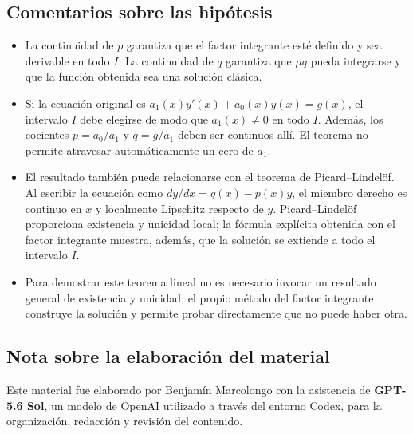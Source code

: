 \documentclass[12pt,a4paper]{article}
\begin{document}
	\subsection{Comentarios sobre las hipótesis}

	\begin{itemize}[leftmargin=*]
		\item La continuidad de \(p\) garantiza que el factor integrante esté definido y sea derivable en todo \(I\). La continuidad de \(q\) garantiza que \(\mu q\) pueda integrarse y que la función obtenida sea una solución clásica.
		\item Si la ecuación original es \(a_1(x)y'(x)+a_0(x)y(x)=g(x)\), el intervalo \(I\) debe elegirse de modo que \(a_1(x)\neq0\) en todo \(I\). Además, los cocientes \(p=a_0/a_1\) y \(q=g/a_1\) deben ser continuos allí. El teorema no permite atravesar automáticamente un cero de \(a_1\).
		\item El resultado también puede relacionarse con el teorema de Picard--Lindelöf. Al escribir la ecuación como \(dy/dx=q(x)-p(x)y\), el miembro derecho es continuo en \(x\) y localmente Lipschitz respecto de \(y\). Picard--Lindelöf proporciona existencia y unicidad local; la fórmula explícita obtenida con el factor integrante muestra, además, que la solución se extiende a todo el intervalo \(I\).
		\item Para demostrar este teorema lineal no es necesario invocar un resultado general de existencia y unicidad: el propio método del factor integrante construye la solución y permite probar directamente que no puede haber otra.
	\end{itemize}

	\subsection*{Nota sobre la elaboración del material}

	Este material fue elaborado por Benjamín Marcolongo con la asistencia de \textbf{GPT-5.6 Sol}, un modelo de OpenAI utilizado a través del entorno Codex, para la organización, redacción y revisión del contenido.
\end{document}

